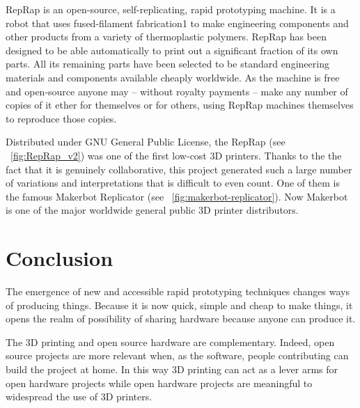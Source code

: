 \begin{formal}
    RepRap is an open-source, self-replicating, rapid prototyping machine. It is a robot that uses fused-filament fabrication1 to make engineering components and other products from a variety of thermoplastic polymers. RepRap has been designed to be able automatically to print out a significant fraction of its own parts. All its remaining parts have been selected to be standard engineering materials and components available cheaply worldwide. As the machine is free and open-source anyone may – without royalty payments – make any number of copies of it ether for themselves or for others, using RepRap machines themselves to reproduce those copies.

\end{formal}


\begin{figure}[tb]
\centering
    \hfil
    \caption{}
    \label{fig:RepRap_project}
\end{figure}


Distributed under GNU General Public License, the RepRap (see \figurename~\ref{fig:RepRap_v2}) was one of the first low-cost 3D printers. Thanks to the the fact that it is genuinely collaborative, this project generated such a large number of variations and interpretations that is difficult to even count. One of them is the famous Makerbot Replicator (see \figurename~\ref{fig:makerbot-replicator}). Now Makerbot is one of the major worldwide general public 3D printer distributors.



\section{Conclusion}

The emergence of new and accessible rapid prototyping techniques changes ways of producing things. Because it is now quick, simple and cheap to make things, it opens the realm of possibility of sharing hardware because anyone can produce it.

The 3D printing and open source hardware are complementary. Indeed, open source projects are more relevant when, as the software, people contributing can build the project at home. In this way 3D printing can act as a lever arms for open hardware projects while open hardware projects are meaningful to widespread the use of 3D printers.

